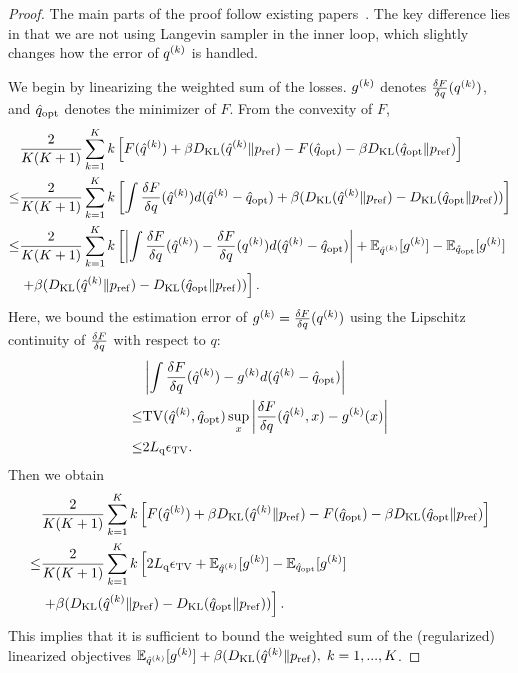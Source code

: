 \begin{proof}
  The main parts of the proof follow existing papers~\citep{NEURIPS2021_a34e1ddb, nishikawa2022twolayer}. The key difference lies in that we are not using Langevin sampler in the inner loop, which slightly changes how the error of $q^{(k)}$ is handled. 

  We begin by linearizing the weighted sum of the losses.
  ${g}^{(k)}$ denotes $\frac{\delta F}{\delta q}(q^{(k)})$, and $\hat{q}_{\mathrm{opt}}$ denotes the minimizer of $F$.
  From the convexity of $F$,
  \begin{align}
    &\frac{2}{K(K+1)}\sum_{k=1}^{K}k \left[ F(\hat{q}^{(k)}) + \beta D_{\mathrm{KL}}(\hat{q}^{(k)}\|p_{\rm{ref}}) - F(\hat{q}_{\mathrm{opt}}) - \beta D_{\mathrm{KL}}(\hat{q}_{\mathrm{opt}}\|p_{\rm{ref}})\right]\\
    \leq& \frac{2}{K(K+1)}\sum_{k=1}^{K}k \left[ \int \frac{\delta F}{\delta q}(\hat{q}^{(k)}) d(\hat{q}^{(k)} - \hat{q}_{\mathrm{opt}})  + \beta (D_{\mathrm{KL}}(\hat{q}^{(k)}\|p_{\rm{ref}}) - D_{\mathrm{KL}}(\hat{q}_{\mathrm{opt}}\|p_{\rm{ref}}))\right]\\
    \leq& \frac{2}{K(K+1)}\sum_{k=1}^{K}k \left[ \left| \int \frac{\delta F}{\delta q}(\hat{q}^{(k)}) - \frac{\delta F}{\delta q}(q^{(k)}) d(\hat{q}^{(k)} - \hat{q}_{\mathrm{opt}})\right|+\mathbb{E}_{\hat{q}^{(k)}}[g^{(k)}] - \mathbb{E}_{\hat{q}_{\mathrm{opt}}}[g^{(k)}]\right. \\
    &\left.+ \beta (D_{\mathrm{KL}}(\hat{q}^{(k)}\|p_{\rm{ref}}) - D_{\mathrm{KL}} (\hat{q}_{\mathrm{opt}}\|p_{\rm{ref}}))\right].
  \end{align}
  Here, we bound the estimation error of ${g}^{(k)} = \frac{\delta F}{\delta q}(q^{(k)})$ using the Lipschitz continuity of $\frac{\delta F}{\delta q}$ with respect to $q$:
  \begin{align}
    &\left| \int \frac{\delta F}{\delta q}(\hat{q}^{(k)}) - {g}^{(k)} d(\hat{q}^{(k)} - \hat{q}_{\mathrm{opt}})\right| \\
    \leq& \mathrm{TV}(\hat{q}^{(k)}, \hat{q}_{\mathrm{opt}}) \sup_x \left|\frac{\delta F}{\delta q}(\hat{q}^{(k)},x) - {g}^{(k)}(x) \right|\\
    \leq& 2L_\mathrm{q}\epsilon_{\mathrm{TV}}.
  \end{align}
  Then we obtain
  \begin{align}
      &\frac{2}{K(K+1)}\sum_{k=1}^{K}k \left[ F(\hat{q}^{(k)}) + \beta D_{\mathrm{KL}}(\hat{q}^{(k)}\|p_{\rm{ref}}) - F(\hat{q}_{\mathrm{opt}}) - \beta D_{\mathrm{KL}}(\hat{q}_{\mathrm{opt}}\|p_{\rm{ref}})\right]\\
      \leq& \frac{2}{K(K+1)}\sum_{k=1}^{K}k \left[2L_\mathrm{q}\epsilon_{\mathrm{TV}} +\mathbb{E}_{\hat{q}^{(k)}}[g^{(k)}] - \mathbb{E}_{\hat{q}_{\mathrm{opt}}}[g^{(k)}]\right. \\
      &\left.+ \beta (D_{\mathrm{KL}}(\hat{q}^{(k)} \|p_{\rm{ref}}) - D_{\mathrm{KL}} (\hat{q}_{\mathrm{opt}}\|p_{\rm{ref}}))\right].\label{eq:appendix-da-ineq-weighted-sum}
  \end{align}
  This implies that it is sufficient to bound the weighted sum of the (regularized) linearized objectives $\mathbb{E}_{\hat{q}^{(k)}}[g^{(k)}] + \beta (D_{\mathrm{KL}}(\hat{q}^{(k)} \|p_{\rm{ref}}), \; k=1,...,K$.
  

\end{proof}

